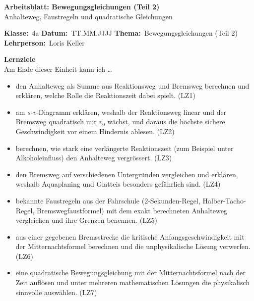 \documentclass[addpoints,11pt,a4paper]{exam}
\newenvironment{infobox}{%
  \par\addvspace{10pt}\noindent
}{%
  \par\addvspace{10pt}
}
\newcommand{\Kopfzeile}[5]{%
  \begin{titlebox}
    {\color{white}\sffamily\bfseries\Large #4}\\[3pt]
    {\color{white}\sffamily\normalsize #5}
  \end{titlebox}
  \vspace{0.5em}
  \noindent\textbf{Klasse:}~#1 \hfill \textbf{Datum:}~#2 \hfill \textbf{Thema:}~#3
    \hfill \textbf{Lehrperson:}~Loris Keller
  \vspace{0.8em}
  \lhead{\textcolor{darkgray}{#3}}
  \rhead{\textcolor{darkgray}{#4}}
}
\newcommand{\Klasse}{4a}
\newcommand{\Datum}{TT.MM.JJJJ}
\newcommand{\Thema}{Bewegungsgleichungen (Teil 2)}
\newcommand{\ArbeitsblattTitel}{Arbeitsblatt: Bewegungsgleichungen (Teil 2)}
\newcommand{\ArbeitsblattUntertitel}{Anhalteweg, Faustregeln und quadratische Gleichungen}
\begin{document}
\Kopfzeile{\Klasse}{\Datum}{\Thema}{\ArbeitsblattTitel}{\ArbeitsblattUntertitel}

\begin{infobox}
\textbf{Lernziele}\\
Am Ende dieser Einheit kann ich \dots
\begin{itemize}[leftmargin=1.2cm,itemsep=0.25em]
  \item den Anhalteweg als Summe aus Reaktionsweg und Bremsweg berechnen und erklären, welche Rolle die Reaktionszeit dabei spielt. (LZ1)
  \item am $s$-$v$-Diagramm erklären, weshalb der Reaktionsweg linear und der Bremsweg quadratisch mit $v_0$ wächst, und daraus die höchste sichere Geschwindigkeit vor einem Hindernis ablesen. (LZ2)
  \item berechnen, wie stark eine verlängerte Reaktionszeit (zum Beispiel unter Alkoholeinfluss) den Anhalteweg vergrössert. (LZ3)
  \item den Bremsweg auf verschiedenen Untergründen vergleichen und erklären, weshalb Aquaplaning und Glatteis besonders gefährlich sind. (LZ4)
  \item bekannte Faustregeln aus der Fahrschule (2-Sekunden-Regel, Halber-Tacho-Regel, Bremswegfaustformel) mit dem exakt berechneten Anhalteweg vergleichen und ihre Grenzen benennen. (LZ5)
  \item aus einer gegebenen Bremsstrecke die kritische Anfangsgeschwindigkeit mit der Mitternachtsformel berechnen und die unphysikalische Lösung verwerfen. (LZ6)
  \item eine quadratische Bewegungsgleichung mit der Mitternachtsformel nach der Zeit auflösen und unter mehreren mathematischen Lösungen die physikalisch sinnvolle auswählen. (LZ7)
\end{itemize}
\end{infobox}
\end{document}
